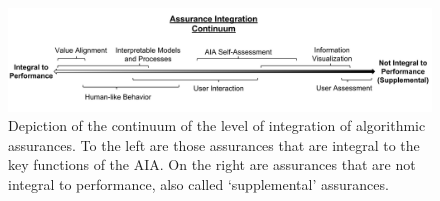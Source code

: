 \begin{figure}[!t]%
    \centering
    \includegraphics[width=1.0\textwidth]{Figures/Assurance_Integration.pdf}
    \caption{Depiction of the continuum of the level of integration of algorithmic assurances. To the left are those assurances that are integral to the key functions of the AIA. On the right are assurances that are not integral to performance, also called `supplemental' assurances.}
    \label{fig:assurance_continuum}
\end{figure}









